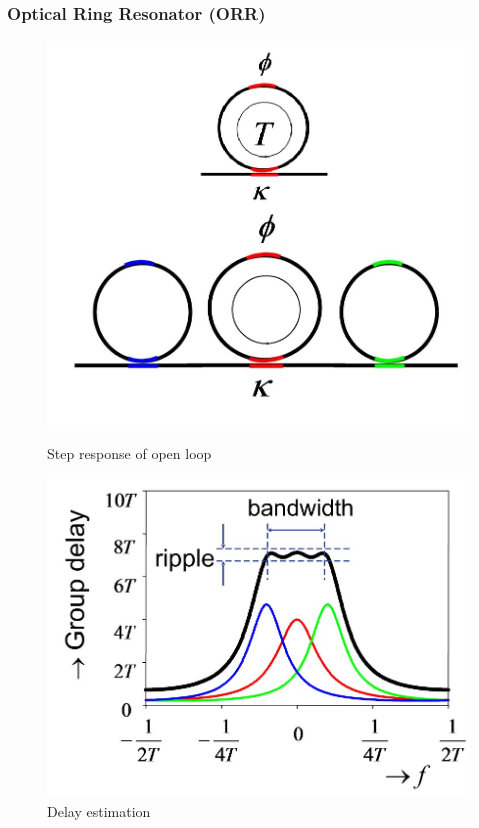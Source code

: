 \documentclass{beamer}
\begin{document}
\begin{frame}\frametitle{Optical Ring Resonator (ORR)}
	\begin{figure}[H]
			\begin{minipage}[t]{0.4\textwidth}
				\centering
				\includegraphics[width=\linewidth]{images/ORR}
				\caption{Step response of open loop}
				\label{fig:bandwidth1}
			\end{minipage}
				\hspace{\fill}
			\begin{minipage}[t]{0.55\textwidth}
				\centering
				\includegraphics[width=\linewidth]{images/ORR2}
				\caption{Delay estimation}
				\label{fig:bandwidth2}
			\end{minipage}
	\end{figure}
\end{frame}
\end{document}
